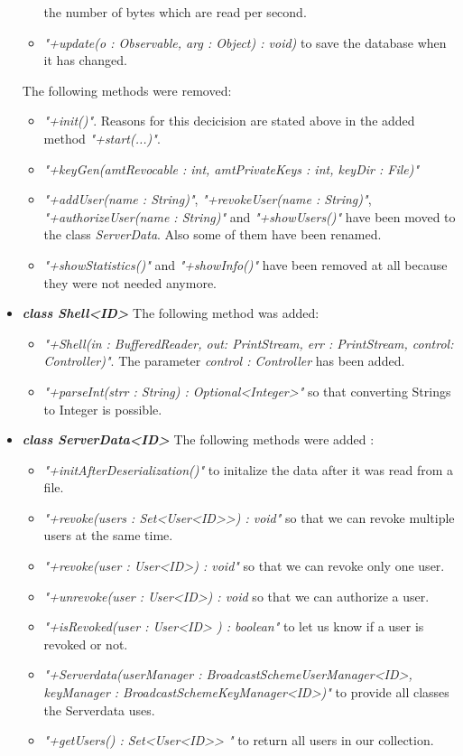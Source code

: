\documentclass[a4paper,10pt]{scrartcl}
\begin{document}
\begin{itemize}
\begin{itemize}
	 	the number of bytes which are read per second.
	\item \textit{"+update(o : Observable, arg : Object) : void)} to save the database when it has changed.
	\end{itemize}
The following methods were removed:
	\begin{itemize}
	\item \textit{"+init()"}. Reasons for this decicision are stated above in the added method \textit{"+start(...)"}.
	\item \textit{"+keyGen(amtRevocable : int, amtPrivateKeys : int, keyDir : File)"}
	\item \textit{"+addUser(name : String)"}, \textit{"+revokeUser(name : String)"}, \textit{"+authorizeUser(name : String)"}
		and \textit{"+showUsers()"} have been moved to the class \textit{ServerData}. Also some of them have been renamed.
	\item \textit{"+showStatistics()"} and \textit{"+showInfo()"} have been removed at all because they were not needed anymore.
	\end{itemize}
\item \textbf{\textit{class Shell<ID>}}\newline
The following method was added:
	\begin{itemize}
	\item \textit{"+Shell(in : BufferedReader, out: PrintStream, err : PrintStream, control: Controller)"}. The parameter \textit{control : Controller}
		has been added.
	\item \textit{"+parseInt(strr : String) : Optional<Integer>"} so that converting Strings to Integer is possible.
	\end{itemize}
	
	\item \textbf{\textit{class ServerData<ID>}}\newline
	The following methods were added :
  \begin{itemize}
 	 \item \textit{"+initAfterDeserialization()"} to initalize the data after it was read from a file.
	 \item \textit{"+revoke(users : Set<User<ID>>) : void"} so that we can revoke multiple users at the same time.
	 \item \textit{"+revoke(user : User<ID>) : void"} so that we can revoke only one user.
	 \item \textit{"+unrevoke(user : User<ID>) : void} so that we can authorize a user.
	 \item \textit{"+isRevoked(user : User<ID> ) : boolean"} to let us know if a user is revoked or not.
	 \item \textit{"+Serverdata(userManager : BroadcastSchemeUserManager<ID>, keyManager :  BroadcastSchemeKeyManager<ID>)"} 
		to provide all classes the Serverdata uses.
	 \item \textit{"+getUsers() : Set<User<ID>> "} to return all users in our collection.
	\end{itemize}


\end{itemize}
\end{document}
